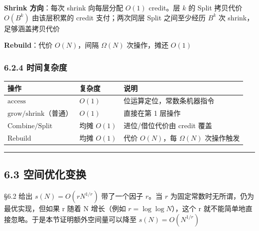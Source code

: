 \documentclass[
  UTF8,
  a4paper,
  12pt]{ctexart}
\newcounter{none} %
\begin{document}
\textbf{Shrink 方向}：每次 shrink 向每层分配 \(O(1)\) credit。层 \(k\)
的 Split 拷贝代价 \(O(B^k)\) 由该层积累的 credit 支付；两次同层 Split
之间至少经历 \(B^k\) 次 shrink，足够涵盖拷贝代价

\textbf{Rebuild}：代价 \(O(N)\)，间隔 \(\Omega(N)\) 次操作，摊还
\(O(1)\)

\subsubsection{6.2.4 时间复杂度}\label{ux65f6ux95f4ux590dux6742ux5ea6-1}

{\def\LTcaptype{none} %
\begin{longtable}[]{@{}
  >{\raggedright\arraybackslash}p{}
  >{\raggedright\arraybackslash}p{}
  >{\raggedright\arraybackslash}p{}@{}}
\toprule\noalign{}
\begin{minipage}[b]{\linewidth}\raggedright
操作
\end{minipage} & \begin{minipage}[b]{\linewidth}\raggedright
复杂度
\end{minipage} & \begin{minipage}[b]{\linewidth}\raggedright
说明
\end{minipage} \\
\midrule\noalign{}
\endhead
\bottomrule\noalign{}
\endlastfoot
\(\text{access}\) & \(O(1)\) & 位运算定位，常数条机器指令 \\
\(\text{grow}/\text{shrink}\)（普通） & \(O(1)\) & 直接在第 1 层操作 \\
\(\text{Combine}/\text{Split}\) & 均摊 \(O(1)\) & 进位/借位代价由 credit
覆盖 \\
\(\text{Rebuild}\) & 均摊 \(O(1)\) & 代价 \(O(N)\)，每 \(\Omega(N)\)
次操作触发 \\
\end{longtable}
}

\begin{center}\rule{0.5\linewidth}{0.5pt}\end{center}

\subsection{6.3
空间优化变换}\label{ux7a7aux95f4ux4f18ux5316ux53d8ux6362}

§6.2 给出 \(s(N) = O(rN^{1/r})\) 带了一个因子 \(r\)。当 \(r\)
为固定常数时无所谓，仍为最优实现，但如果 r 随着 N 增长（例如
\(r = \log \log N\)），这个 r
就不能简单地直接忽略。于是本节证明额外空间量可以降至
\(s(N) = O(N^{1/r})\)
\end{document}
